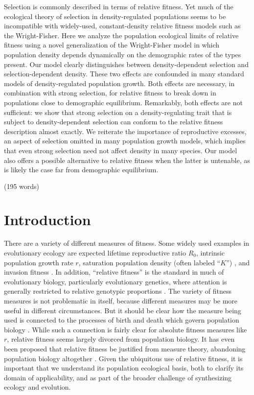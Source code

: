 \documentclass[12pt]{article}
\begin{document}
Selection is commonly described in terms of relative fitness. Yet much of the ecological theory of selection in density-regulated populations seems to be incompatible with widely-used, constant-density relative fitness models such as the Wright-Fisher. Here we analyze the population ecological limits of relative fitness using a novel generalization of the Wright-Fisher model in which population density depends dynamically on the demographic rates of the types present. Our model clearly distinguishes between density-dependent selection and selection-dependent density. These two effects are confounded in many standard models of density-regulated population growth. Both effects are necessary, in combination with strong selection, for relative fitness to break down in populations close to demographic equilibrium.  Remarkably, both effects are not sufficient: we show that strong selection on a density-regulating trait that is subject to density-dependent selection can conform to the relative fitness description almost exactly. We reiterate the importance of reproductive excesses, an aspect of selection omitted in many population growth models, which implies that even strong selection need not affect density in many species. Our model also offers a possible alternative to relative fitness when the latter is untenable, as is likely the case far from demographic equilibrium. 

\noindent (195 words)



\newpage{}


\section*{Introduction}

There are a variety of different measures of fitness. Some widely used examples in evolutionary ecology are expected lifetime reproductive ratio $R_0$, intrinsic population growth rate $r$, saturation population density (often labeled ``$K$'') \citep{benton_2000}, and invasion fitness \citep{metz_1992}. In addition, ``relative fitness'' is the standard in much of evolutionary biology, particularly evolutionary genetics, where attention is generally restricted to relative genotypic proportions \cite[pp. 468]{barton_2007}. The variety of fitness measures is not problematic in itself, because different measures may be more useful in different circumstances. But it should be clear how the measure being used is connected to the processes of birth and death which govern population biology \citep{metcalf_2007,doebeli_2017}. While such a connection is fairly clear for absolute fitness measures like $r$, relative fitness seems largely divorced from population biology. It has even been proposed that relative fitness be justified from measure theory, abandoning population biology altogether \citep{wagner_2010}. Given the ubiquitous use of relative fitness, it is important that we understand its population ecological basis, both to clarify its domain of applicability, and as part of the broader challenge of synthesizing ecology and evolution.
\end{document}
